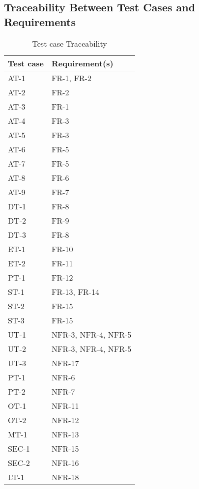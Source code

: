 \documentclass[12pt, titlepage]{article}
\begin{document}
\subsection{Traceability Between Test Cases and Requirements}

\begin{table}[H]
  \caption{Test case Traceability}
  \begin{tabular}{|p{7cm}|p{7cm}|}
  \hline
  Test case & Requirement(s)\\
  \hline
  AT-1 & FR-1, FR-2\\
  \hline
  AT-2 & FR-2\\
  \hline
  AT-3 & FR-1\\
  \hline
  AT-4 & FR-3\\
  \hline
  AT-5 & FR-3\\
  \hline
  AT-6 & FR-5\\
  \hline
  AT-7 & FR-5\\
  \hline
  AT-8 & FR-6\\
  \hline
  AT-9 & FR-7\\
  \hline
  DT-1 & FR-8\\
  \hline
  DT-2 & FR-9\\
  \hline
  DT-3 & FR-8\\
  \hline
  ET-1 & FR-10\\
  \hline
  ET-2 & FR-11\\
  \hline
  PT-1 & FR-12\\
  \hline
  ST-1 & FR-13, FR-14\\
  \hline
  ST-2 & FR-15\\
  \hline
  ST-3 & FR-15\\
  \hline
  UT-1 & NFR-3, NFR-4, NFR-5\\
  \hline
  UT-2 & NFR-3, NFR-4, NFR-5\\
  \hline
  UT-3 & NFR-17\\
  \hline
  PT-1 & NFR-6\\
  \hline
  PT-2 & NFR-7\\
  \hline
  OT-1 & NFR-11\\
  \hline
  OT-2 & NFR-12\\
  \hline
 MT-1 & NFR-13\\
  \hline
 SEC-1 & NFR-15\\
  \hline
 SEC-2 & NFR-16\\
 LT-1 & NFR-18\\
  \hline
  \end{tabular}
\end{table}
\end{document}

